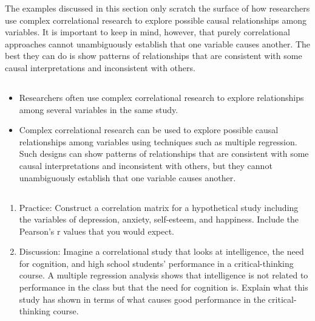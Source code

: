 The examples discussed in this section only scratch the surface of how researchers use complex correlational research to explore possible causal relationships among variables. It is important to keep in mind, however, that purely correlational approaches cannot unambiguously establish that one variable causes another. The best they can do is show patterns of relationships that are consistent with some causal interpretations and inconsistent with others.

\subsection{}
\begin{fullwidth}
\begin{itemize}

\item Researchers often use complex correlational research to explore relationships among several variables in the same study.
\item Complex correlational research can be used to explore possible causal relationships among variables using techniques such as multiple regression. Such designs can show patterns of relationships that are consistent with some causal interpretations and inconsistent with others, but they cannot unambiguously establish that one variable causes another.
\end{itemize}
\end{fullwidth}

\subsection{}
\begin{fullwidth}
\begin{enumerate}
\item  Practice: Construct a correlation matrix for a hypothetical study including the variables of depression, anxiety, self-esteem, and happiness. Include the Pearson's r values that you would expect.
\item Discussion: Imagine a correlational study that looks at intelligence, the need for cognition, and high school students' performance in a critical-thinking course. A multiple regression analysis shows that intelligence is not related to performance in the class but that the need for cognition is. Explain what this study has shown in terms of what causes good performance in the critical- thinking course.
\end{enumerate}
\end{fullwidth}  
